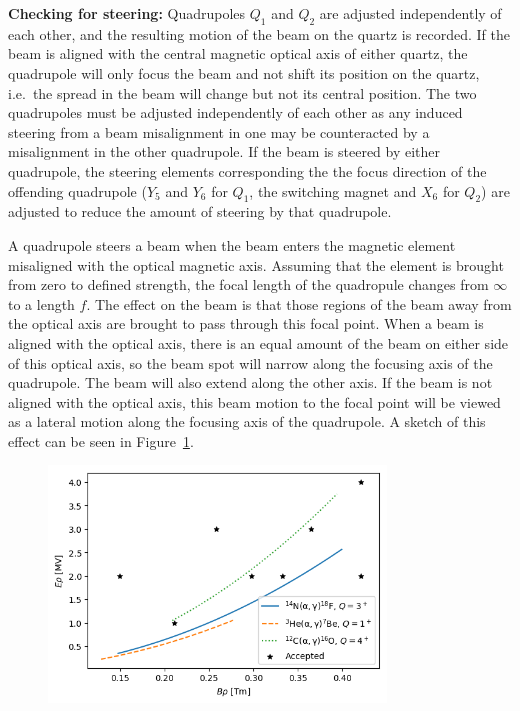 \textbf{Checking for steering:}
Quadrupoles $Q_1$ and $Q_2$ are adjusted independently of each other, and the
resulting motion of the beam on the quartz is recorded. If the beam is aligned
with the central magnetic optical axis of either quartz, the quadrupole will
only focus the beam and not shift its position on the quartz, i.e.\ the spread
in the beam will
change but not its central position. The two quadrupoles must be adjusted
independently of each other as any induced steering from a beam misalignment in
one may be counteracted by a misalignment in the other quadrupole. If the beam
is steered by either quadrupole, the steering elements corresponding the the
focus direction of the offending quadrupole ($Y_5$ and $Y_6$ for $Q_1$, the
switching magnet and $X_6$ for $Q_2$) are adjusted to reduce the amount of
steering by that quadrupole.

A quadrupole steers a beam when the beam enters the magnetic element misaligned
with the optical magnetic axis. Assuming that the element is brought from zero
to defined strength, the focal length of the quadropule changes from
$\infty$ to a length $f$. The effect on the beam is that those regions of the
beam away from the optical axis are brought to pass through this focal point.
When a beam is aligned with the optical axis, there is an equal amount of the
beam on either side of this optical axis, so the beam spot will narrow along
the focusing axis of the quadrupole. The beam will also extend along the other
axis. If the beam is not aligned with the
optical axis, this beam motion to the focal point will be viewed as a lateral
motion along the focusing axis of the quadrupole.
A sketch of this effect can be seen in Figure~\ref{fig:steering}.

\begin{figure}[t]
   \begin{center}
       \centerline{\includegraphics[width=0.8\textwidth]
           {figures/rigidity_phase_space.png}}
       \caption[Sketch of quadrupole steering of misaligned beam]{}
       \label{fig:steering}
   \end{center}
\end{figure}

